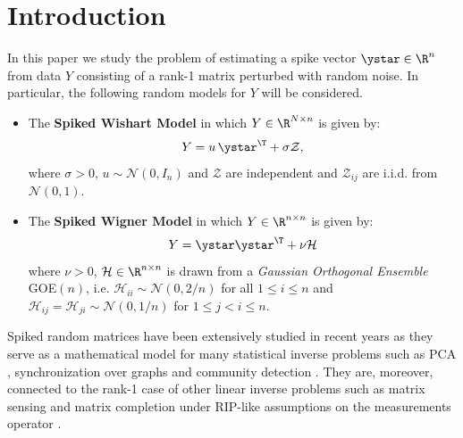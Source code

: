 \section{Introduction}

In this paper we study the problem of estimating a spike vector $\ystar \in \R^n$ from data $Y$ consisting of a rank-1 matrix perturbed with random noise. In particular, the following random models for $Y$ will be considered.
\begin{itemize}
	\item The \textbf{Spiked Wishart Model} in which $Y \in \R^{N \times n}$ is given by:
	\begin{equation}\label{eq:wishart_Y}
	Y = u \, \ystar^\T + \sigma \mathcal{Z},
	\end{equation}
	where $\sigma > 0$, $u \sim \mathcal{N}(0,I_n)$ and $\mathcal{Z}$ are independent
	and $\mathcal{Z}_{ij}$ are i.i.d. from $\mathcal{N}(0,1)$.
	
	\item The \textbf{Spiked Wigner Model} in which $Y  \in \R^{n \times n}$ is given by:
	\begin{equation}\label{eq:wigner_Y}
	Y = \ystar \ystar^\T + \nu \mathcal{H} 
	\end{equation}
	where $\nu > 0$, $\mathcal{H} \in \R^{n \times n}$ 
	is drawn from a \textit{Gaussian Orthogonal Ensemble} GOE$(n)$, 
	i.e. $\mathcal{H}_{ii} \sim \mathcal{N}(0, 2/n)$ for all $1 \leq i \leq n$ and $\mathcal{H}_{ij} = \mathcal{H}_{ji} \sim \mathcal{N}(0,1/n)$ for $1 \leq j < i \leq n$.
\end{itemize}
Spiked random matrices have been extensively studied in recent years as they serve as a mathematical model for many statistical inverse problems such as PCA \citep{johnstone2001distribution,amini2008high, deshpande2014sparse, vu2012minimax}, synchronization over graphs \citep{abbe2014decoding,bandeira2015non,javanmard2016phase} and community detection  \citep{mcsherry2001spectral,deshpande2016asymptotic,moore2017computer}. They are, moreover, connected to the rank-1 case of other linear inverse problems such as matrix sensing and matrix completion under RIP-like assumptions on the measurements operator \cite{bhojanapalli2016global,zhang2018much}. 

